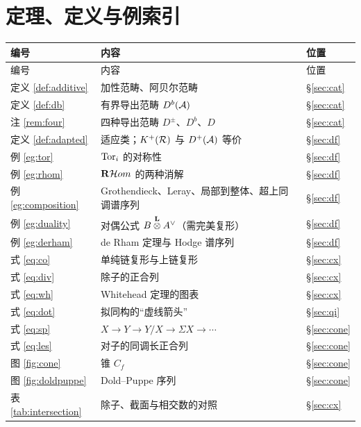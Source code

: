 \section{定理、定义与例索引}\label{app:index}

{\small
\renewcommand{\arraystretch}{1.25}
\begin{longtable}{@{}p{1.6cm}p{5.4cm}p{6.4cm}@{}}
\toprule
编号 & 内容 & 位置\\
\midrule
\endfirsthead
\toprule
编号 & 内容 & 位置\\
\midrule
\endhead
\bottomrule
\endlastfoot
定义 \ref{def:additive} & 加性范畴、阿贝尔范畴 & \S\ref{sec:cat}\\
定义 \ref{def:db} & 有界导出范畴 $D^b(\mathcal{A})$ & \S\ref{sec:cat}\\
注 \ref{rem:four} & 四种导出范畴 $D^\pm$、$D^b$、$D$ & \S\ref{sec:cat}\\
定义 \ref{def:adapted} & 适应类；$K^+(\mathcal{R})$ 与 $D^+(\mathcal{A})$ 等价 & \S\ref{sec:df}\\
例 \ref{eg:tor} & $\operatorname{Tor}_i$ 的对称性 & \S\ref{sec:df}\\
例 \ref{eg:rhom} & $\mathbf{R}\mathcal Hom$ 的两种消解 & \S\ref{sec:df}\\
例 \ref{eg:composition} & Grothendieck、Leray、局部到整体、超上同调谱序列 & \S\ref{sec:df}\\
例 \ref{eg:duality} & 对偶公式 $B\Ltimes A\ve$（需完美复形） & \S\ref{sec:df}\\
例 \ref{eg:derham} & de Rham 定理与 Hodge 谱序列 & \S\ref{sec:df}\\
\midrule
式 \eqref{eq:co} & 单纯链复形与上链复形 & \S\ref{sec:cx}\\
式 \eqref{eq:div} & 除子的正合列 & \S\ref{sec:cx}\\
式 \eqref{eq:wh} & Whitehead 定理的图表 & \S\ref{sec:cx}\\
式 \eqref{eq:dot} & 拟同构的“虚线箭头” & \S\ref{sec:qi}\\
式 \eqref{eq:sp} & $X\to Y\to Y/X\to\Sigma X\to\cdots$ & \S\ref{sec:cone}\\
式 \eqref{eq:les} & 对子的同调长正合列 & \S\ref{sec:cone}\\
图 \ref{fig:cone} & 锥 $C_f$ & \S\ref{sec:cone}\\
图 \ref{fig:doldpuppe} & Dold--Puppe 序列 & \S\ref{sec:cone}\\
表 \ref{tab:intersection} & 除子、截面与相交数的对照 & \S\ref{sec:cx}\\
\end{longtable}
}

